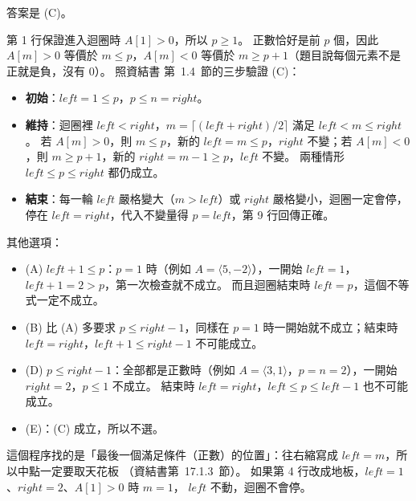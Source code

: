 \begin{pastsoln}
答案是 (C)。

第 1 行保證進入迴圈時 $A[1] > 0$，所以 $p \ge 1$。 正數恰好是前 $p$ 個，因此 $A[m] > 0$ 等價於
$m \le p$，$A[m] < 0$ 等價於 $m \ge p + 1$（題目說每個元素不是正就是負，沒有 $0$）。 照資結書
第~1.4~節的三步驗證 (C)：
\begin{itemize}
\item \textbf{初始}：$left = 1 \le p$，$p \le n = right$。
\item \textbf{維持}：迴圈裡 $left < right$，$m = \lceil (left + right)/2 \rceil$ 滿足
$left < m \le right$。 若 $A[m] > 0$，則 $m \le p$，新的 $left = m \le p$，$right$ 不變；若
$A[m] < 0$，則 $m \ge p + 1$，新的 $right = m - 1 \ge p$，$left$ 不變。 兩種情形
$left \le p \le right$ 都仍成立。
\item \textbf{結束}：每一輪 $left$ 嚴格變大（$m > left$）或 $right$ 嚴格變小，迴圈一定會停，停在
$left = right$，代入不變量得 $p = left$，第 9 行回傳正確。
\end{itemize}

其他選項：
\begin{itemize}
\item (A) $left + 1 \le p$：$p = 1$ 時（例如 $A = \langle 5, -2 \rangle$），一開始 $left = 1$，
$left + 1 = 2 > p$，第一次檢查就不成立。 而且迴圈結束時 $left = p$，這個不等式一定不成立。
\item (B) 比 (A) 多要求 $p \le right - 1$，同樣在 $p = 1$ 時一開始就不成立；結束時
$left = right$，$left + 1 \le right - 1$ 不可能成立。
\item (D) $p \le right - 1$：全部都是正數時（例如 $A = \langle 3, 1 \rangle$，$p = n = 2$），一開始
$right = 2$，$p \le 1$ 不成立。 結束時 $left = right$，$left \le p \le left - 1$ 也不可能成立。
\item (E)：(C) 成立，所以不選。
\end{itemize}

這個程序找的是「最後一個滿足條件（正數）的位置」：往右縮寫成 $left = m$，所以中點一定要取天花板
（資結書第~17.1.3~節）。 如果第 4 行改成地板，$left = 1$、$right = 2$、$A[1] > 0$ 時 $m = 1$，
$left$ 不動，迴圈不會停。
\end{pastsoln}

